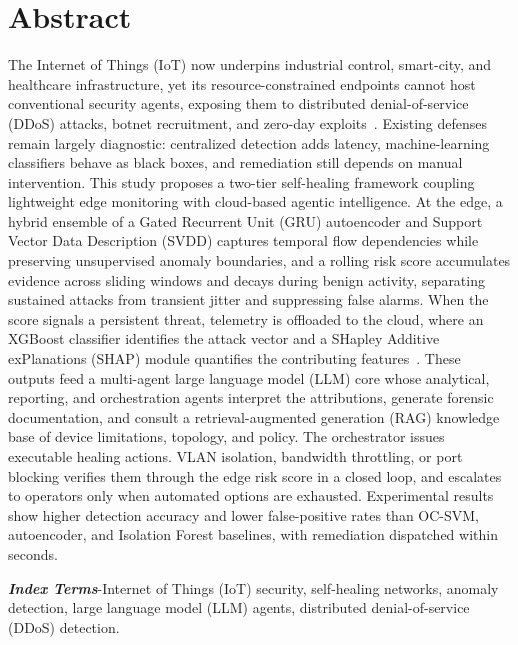 
\chapter*{Abstract}

The Internet of Things (IoT) now underpins industrial control, smart-city, and healthcare infrastructure, yet its resource-constrained endpoints cannot host conventional security agents, exposing them to distributed denial-of-service (DDoS) attacks, botnet recruitment, and zero-day exploits~\cite{Antonakakis2017}. Existing defenses remain largely diagnostic: centralized detection adds latency, machine-learning classifiers behave as black boxes, and remediation still depends on manual intervention. This study proposes a two-tier self-healing framework coupling lightweight edge monitoring with cloud-based agentic intelligence. At the edge, a hybrid ensemble of a Gated Recurrent Unit (GRU) autoencoder and Support Vector Data Description (SVDD) captures temporal flow dependencies while preserving unsupervised anomaly boundaries, and a rolling risk score accumulates evidence across sliding windows and decays during benign activity, separating sustained attacks from transient jitter and suppressing false alarms. When the score signals a persistent threat, telemetry is offloaded to the cloud, where an XGBoost classifier identifies the attack vector and a SHapley Additive exPlanations (SHAP) module quantifies the contributing features~\cite{Lundberg2017}. These outputs feed a multi-agent large language model (LLM) core whose analytical, reporting, and orchestration agents interpret the attributions, generate forensic documentation, and consult a retrieval-augmented generation (RAG) knowledge base of device limitations, topology, and policy. The orchestrator issues executable healing actions. VLAN isolation, bandwidth throttling, or port blocking verifies them through the edge risk score in a closed loop, and escalates to operators only when automated options are exhausted. Experimental results show higher detection accuracy and lower false-positive rates than OC-SVM, autoencoder, and Isolation Forest baselines, with remediation dispatched within seconds.

\vspace{1em}
\noindent\textbf{\textit{Index Terms}}-Internet of Things (IoT) security, self-healing networks, anomaly detection, large language model (LLM) agents, distributed denial-of-service (DDoS) detection.
